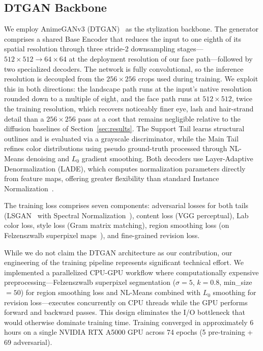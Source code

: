 \documentclass[journal]{IEEEtran}
\begin{document}
\subsection{DTGAN Backbone}
\label{subsec:dtgan}

We employ AnimeGANv3 (DTGAN)~\cite{Liu2024} as the stylization backbone. The generator comprises a shared Base Encoder that reduces the input to one eighth of its spatial resolution through three stride-2 downsampling stages---$512 \times 512 \rightarrow 64 \times 64$ at the deployment resolution of our face path---followed by two specialized decoders. The network is fully convolutional, so the inference resolution is decoupled from the $256 \times 256$ crops used during training. We exploit this in both directions: the landscape path runs at the input's native resolution rounded down to a multiple of eight, and the face path runs at $512 \times 512$, twice the training resolution, which recovers noticeably finer eye, lash and hair-strand detail than a $256 \times 256$ pass at a cost that remains negligible relative to the diffusion baselines of Section~\ref{sec:results}. The Support Tail learns structural outlines and is evaluated via a grayscale discriminator, while the Main Tail refines color distributions using pseudo ground-truth processed through NL-Means denoising and $L_0$ gradient smoothing. Both decoders use Layer-Adaptive Denormalization (LADE), which computes normalization parameters directly from feature maps, offering greater flexibility than standard Instance Normalization~\cite{Ulyanov2016}.

The training loss comprises seven components: adversarial losses for both tails (LSGAN~\cite{Mao2017} with Spectral Normalization~\cite{Miyato2018}), content loss (VGG perceptual), Lab color loss, style loss (Gram matrix matching), region smoothing loss (on Felzenszwalb superpixel maps~\cite{Felzenszwalb2004}), and fine-grained revision loss.

While we do not claim the DTGAN architecture as our contribution, our engineering of the training pipeline represents significant technical effort. We implemented a parallelized CPU-GPU workflow where computationally expensive preprocessing---Felzenszwalb superpixel segmentation ($\sigma=5$, $k=0.8$, min\_size$=50$) for region smoothing loss and NL-Means combined with $L_0$ smoothing for revision loss---executes concurrently on CPU threads while the GPU performs forward and backward passes. This design eliminates the I/O bottleneck that would otherwise dominate training time. Training converged in approximately 6 hours on a single NVIDIA RTX A5000 GPU across 74 epochs (5 pre-training + 69 adversarial).
\end{document}
